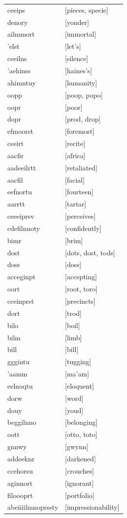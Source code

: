 \documentclass{article}
\begin{document}
\begin{tabular}{ll}
ceeips & [pieces, specie] \\
denory & [yonder] \\
ailmmort & [immortal] \\
'elst & [let's] \\
ceeilns & [silence] \\
'aehinss & [haines's] \\
ahimntuy & [humanity] \\
oopp & [poop, popo] \\
oopr & [poor] \\
dopr & [prod, drop] \\
efmoorst & [foremost] \\
ceeirt & [recite] \\
aacfir & [africa] \\
aadeeilrtt & [retaliated] \\
aacfil & [facial] \\
eefnortu & [fourteen] \\
aarrtt & [tartar] \\
ceeeiprsv & [perceives] \\
cdefilnnoty & [confidently] \\
bimr & [brim] \\
dost & [dots, dost, tods] \\
doss & [doss] \\
acceginpt & [accepting] \\
oort & [root, toro] \\
cceinprst & [precincts] \\
dort & [trod] \\
bilo & [boil] \\
bilm & [limb] \\
bill & [bill] \\
gggintu & [tugging] \\
'aamm & [ma'am] \\
eelnoqtu & [eloquent] \\
dorw & [word] \\
douy & [youd] \\
beggilnno & [belonging] \\
oott & [otto, toto] \\
gnnwy & [gwynn] \\
addeeknr & [darkened] \\
ccehorsu & [crouches] \\
aginnort & [ignorant] \\
filoooprt & [portfolio] \\
abeiiiilmnoprssty & [impressionability] \\

\end{tabular}
\end{document}
